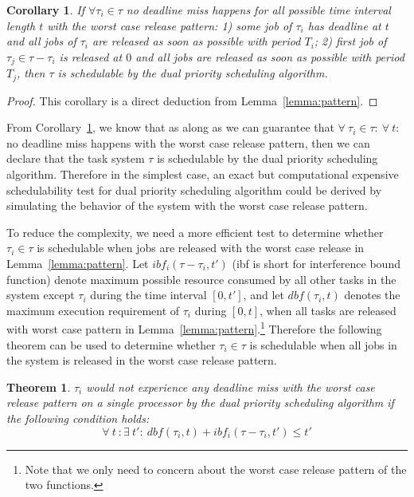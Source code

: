 \documentclass[12pt,conference,twocolumn]{IEEEtran}
\newtheorem{theorem}{Theorem}
\newtheorem{proof}{Proof}
\newtheorem{corollary}{Corollary}
\begin{document}
{\begin{corollary}
\label{corollary:condition}
If  $\forall \tau_i\in \tau$ no deadline miss happens for all possible time interval length $t$ with the worst case release pattern:  1) some job of $\tau_i$ has deadline at $t$  and all jobs of $\tau_i$ are released as soon as possible  with period $T_i$; 2) first job of $\tau_j\in \tau-\tau_i$ is released at $0$ and all jobs are released as soon as possible with period $T_j$, then $\tau$ is schedulable by the dual priority scheduling algorithm.
\end{corollary}
\begin{proof}
This corollary is a direct deduction from Lemma~\ref{lemma:pattern}.
\end{proof}


From Corollary~\ref{corollary:condition}, we know  that as along as we can guarantee that $\forall~\tau_i\in \tau:~\forall~t:$ no deadline miss happens with the worst case release pattern,  then we can declare that the task system $\tau$ is schedulable by the dual priority scheduling algorithm. Therefore  in the simplest case,  an exact but computational expensive schedulability test for dual priority scheduling algorithm could be derived by simulating the behavior of the system with the worst case release pattern. 


To reduce the complexity, we need a more efficient test to determine whether $\tau_i\in\tau$ is schedulable when jobs are released with the worst case release in Lemma~\ref{lemma:pattern}. Let $ibf_i(\tau-\tau_i,t')$ (ibf is short for interference bound function) denote maximum possible resource consumed by all other tasks in the system except $\tau_i$ during the time interval $[0,t']$, and let $dbf(\tau_i,t)$ denotes the maximum execution requirement of $\tau_i$ during $[0,t]$,  when all tasks are released with worst case pattern in Lemma~\ref{lemma:pattern}.\footnote{Note that we only need to concern about the worst case release pattern of the two functions.}  Therefore the following theorem can be used to determine whether $\tau_i\in \tau$ is schedulable when all jobs in the system is released in the worst case release pattern.
}
\begin{theorem}
$\tau_i$ would not experience any deadline miss with the worst case release pattern on a single processor by the dual priority scheduling algorithm if the following condition holds:
\begin{equation}
\label{eq:1}
\forall~t~:\exists~t':~dbf(\tau_i,t)+ibf_i(\tau-\tau_i,t')\leq t'
\end{equation} 
\end{theorem}
\end{document}
